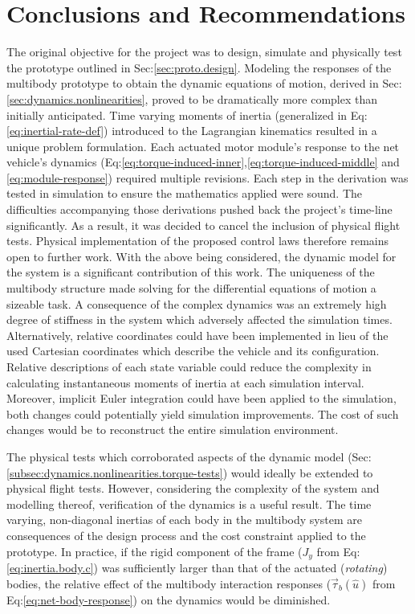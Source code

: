\chapter{Conclusions and Recommendations}
\label{ch:conclusion}
The original objective for the project was to design, simulate and physically test the prototype outlined in Sec:\ref{sec:proto.design}. Modeling the responses of the multibody prototype to obtain the dynamic equations of motion, derived in Sec:\ref{sec:dynamics.nonlinearities}, proved to be dramatically more complex than initially anticipated. 
Time varying moments of inertia (generalized in Eq:\ref{eq:inertial-rate-def}) introduced to the Lagrangian kinematics resulted in a unique problem formulation. Each actuated motor module's response to the net vehicle's dynamics (Eq:\ref{eq:torque-induced-inner},\ref{eq:torque-induced-middle} and \ref{eq:module-response}) required multiple revisions. Each step in the derivation was tested in simulation to ensure the mathematics applied were sound. The difficulties accompanying those derivations pushed back the project's time-line significantly. As a result, it was decided to cancel the inclusion of physical flight tests. Physical implementation of the proposed control laws therefore remains open to further work.  With the above being considered, the dynamic model for the system is a significant contribution of this work. The uniqueness of the multibody structure made solving for the differential equations of motion a sizeable task. A consequence of the complex dynamics was an extremely high degree of stiffness in the system which adversely affected the simulation times. Alternatively, relative coordinates could have been implemented in lieu of the used Cartesian coordinates which describe the vehicle and its configuration. Relative descriptions of each state variable could reduce the complexity in calculating instantaneous moments of inertia at each simulation interval. Moreover, implicit Euler integration could have been applied to the simulation, both changes could potentially yield simulation improvements. The cost of such changes would be to reconstruct the entire simulation environment.
\par
The physical tests which corroborated aspects of the dynamic model (Sec:\ref{subsec:dynamics.nonlinearities.torque-tests}) would ideally be extended to physical flight tests. However, considering the complexity of the system and modelling thereof, verification of the dynamics is a useful result. The time varying, non-diagonal inertias of each body  in the multibody system are consequences of the design process and the cost constraint applied to the prototype. In practice, if the rigid component of the frame ($J_y$ from Eq:\ref{eq:inertia.body.c}) was sufficiently larger than that of the actuated (\emph{rotating}) bodies, the relative effect of the multibody interaction responses ($\vec{\tau}_b(\hat{u})$ from Eq:\ref{eq:net-body-response}) on the dynamics would be diminished.
